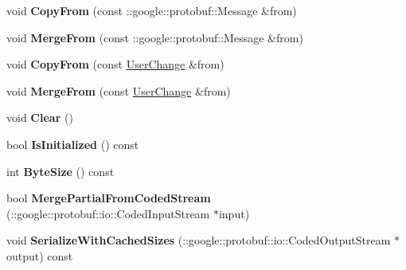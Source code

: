 \begin{DoxyCompactItemize}
\item 
\hypertarget{classSimpleChat_1_1UserChange_abe2909bb1bd29d8f6b76109d297d2bfe}{void {\bfseries Copy\-From} (const \-::google\-::protobuf\-::\-Message \&from)}\label{classSimpleChat_1_1UserChange_abe2909bb1bd29d8f6b76109d297d2bfe}

\item 
\hypertarget{classSimpleChat_1_1UserChange_af0c77bbe4fbb9f176163dbaec55ee1e0}{void {\bfseries Merge\-From} (const \-::google\-::protobuf\-::\-Message \&from)}\label{classSimpleChat_1_1UserChange_af0c77bbe4fbb9f176163dbaec55ee1e0}

\item 
\hypertarget{classSimpleChat_1_1UserChange_a96f9d6b6aef9b69a2c5061aefcace76e}{void {\bfseries Copy\-From} (const \hyperlink{classSimpleChat_1_1UserChange}{User\-Change} \&from)}\label{classSimpleChat_1_1UserChange_a96f9d6b6aef9b69a2c5061aefcace76e}

\item 
\hypertarget{classSimpleChat_1_1UserChange_a9df766794ff5648f206c9647fac83584}{void {\bfseries Merge\-From} (const \hyperlink{classSimpleChat_1_1UserChange}{User\-Change} \&from)}\label{classSimpleChat_1_1UserChange_a9df766794ff5648f206c9647fac83584}

\item 
\hypertarget{classSimpleChat_1_1UserChange_a4157339eb9cf75c110b41b6c27e58b06}{void {\bfseries Clear} ()}\label{classSimpleChat_1_1UserChange_a4157339eb9cf75c110b41b6c27e58b06}

\item 
\hypertarget{classSimpleChat_1_1UserChange_af3b596da94708ece2b51f080b30f7ef6}{bool {\bfseries Is\-Initialized} () const }\label{classSimpleChat_1_1UserChange_af3b596da94708ece2b51f080b30f7ef6}

\item 
\hypertarget{classSimpleChat_1_1UserChange_a6285488acc38fac76c544babde9b3d23}{int {\bfseries Byte\-Size} () const }\label{classSimpleChat_1_1UserChange_a6285488acc38fac76c544babde9b3d23}

\item 
\hypertarget{classSimpleChat_1_1UserChange_ac39dca4e2b592c5e3ac259cfe01e079d}{bool {\bfseries Merge\-Partial\-From\-Coded\-Stream} (\-::google\-::protobuf\-::io\-::\-Coded\-Input\-Stream $\ast$input)}\label{classSimpleChat_1_1UserChange_ac39dca4e2b592c5e3ac259cfe01e079d}

\item 
\hypertarget{classSimpleChat_1_1UserChange_a35fe2d61b97ff6c1cd56bf5f7b2a814b}{void {\bfseries Serialize\-With\-Cached\-Sizes} (\-::google\-::protobuf\-::io\-::\-Coded\-Output\-Stream $\ast$output) const }\label{classSimpleChat_1_1UserChange_a35fe2d61b97ff6c1cd56bf5f7b2a814b}


\end{DoxyCompactItemize}
